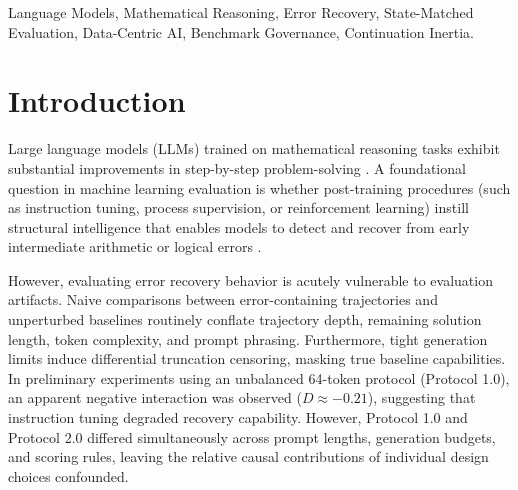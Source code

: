 \documentclass[10pt,conference]{IEEEtran}
\begin{document}
\begin{IEEEkeywords}
Language Models, Mathematical Reasoning, Error Recovery, State-Matched Evaluation, Data-Centric AI, Benchmark Governance, Continuation Inertia.
\end{IEEEkeywords}

\section{Introduction}
Large language models (LLMs) trained on mathematical reasoning tasks exhibit substantial improvements in step-by-step problem-solving \cite{cobbe2021gsm8k, qwen25math2024}. A foundational question in machine learning evaluation is whether post-training procedures (such as instruction tuning, process supervision, or reinforcement learning) instill structural intelligence that enables models to detect and recover from early intermediate arithmetic or logical errors \cite{lightman2023process, zelikman2022star}.

However, evaluating error recovery behavior is acutely vulnerable to evaluation artifacts. Naive comparisons between error-containing trajectories and unperturbed baselines routinely conflate trajectory depth, remaining solution length, token complexity, and prompt phrasing. Furthermore, tight generation limits induce differential truncation censoring, masking true baseline capabilities. In preliminary experiments using an unbalanced 64-token protocol (Protocol 1.0), an apparent negative interaction was observed ($D \approx -0.21$), suggesting that instruction tuning degraded recovery capability. However, Protocol 1.0 and Protocol 2.0 differed simultaneously across prompt lengths, generation budgets, and scoring rules, leaving the relative causal contributions of individual design choices confounded.
\end{document}
